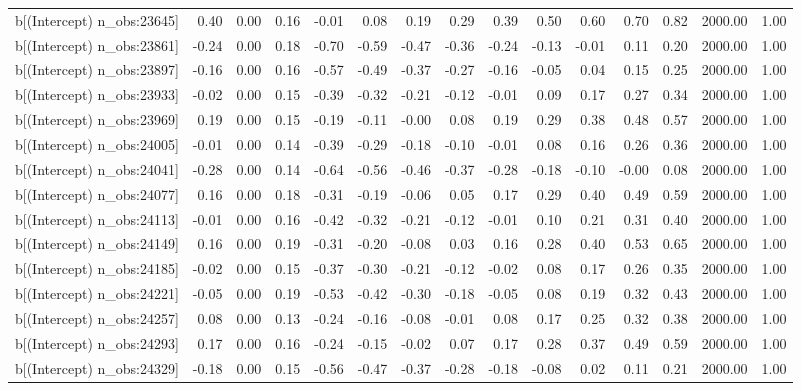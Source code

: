 \begin{table}[ht]
\begin{tabular}{rrrrrrrrrrrrrrr}
  b[(Intercept) n\_obs:23645] & 0.40 & 0.00 & 0.16 & -0.01 & 0.08 & 0.19 & 0.29 & 0.39 & 0.50 & 0.60 & 0.70 & 0.82 & 2000.00 & 1.00 \\ 
  b[(Intercept) n\_obs:23861] & -0.24 & 0.00 & 0.18 & -0.70 & -0.59 & -0.47 & -0.36 & -0.24 & -0.13 & -0.01 & 0.11 & 0.20 & 2000.00 & 1.00 \\ 
  b[(Intercept) n\_obs:23897] & -0.16 & 0.00 & 0.16 & -0.57 & -0.49 & -0.37 & -0.27 & -0.16 & -0.05 & 0.04 & 0.15 & 0.25 & 2000.00 & 1.00 \\ 
  b[(Intercept) n\_obs:23933] & -0.02 & 0.00 & 0.15 & -0.39 & -0.32 & -0.21 & -0.12 & -0.01 & 0.09 & 0.17 & 0.27 & 0.34 & 2000.00 & 1.00 \\ 
  b[(Intercept) n\_obs:23969] & 0.19 & 0.00 & 0.15 & -0.19 & -0.11 & -0.00 & 0.08 & 0.19 & 0.29 & 0.38 & 0.48 & 0.57 & 2000.00 & 1.00 \\ 
  b[(Intercept) n\_obs:24005] & -0.01 & 0.00 & 0.14 & -0.39 & -0.29 & -0.18 & -0.10 & -0.01 & 0.08 & 0.16 & 0.26 & 0.36 & 2000.00 & 1.00 \\ 
  b[(Intercept) n\_obs:24041] & -0.28 & 0.00 & 0.14 & -0.64 & -0.56 & -0.46 & -0.37 & -0.28 & -0.18 & -0.10 & -0.00 & 0.08 & 2000.00 & 1.00 \\ 
  b[(Intercept) n\_obs:24077] & 0.16 & 0.00 & 0.18 & -0.31 & -0.19 & -0.06 & 0.05 & 0.17 & 0.29 & 0.40 & 0.49 & 0.59 & 2000.00 & 1.00 \\ 
  b[(Intercept) n\_obs:24113] & -0.01 & 0.00 & 0.16 & -0.42 & -0.32 & -0.21 & -0.12 & -0.01 & 0.10 & 0.21 & 0.31 & 0.40 & 2000.00 & 1.00 \\ 
  b[(Intercept) n\_obs:24149] & 0.16 & 0.00 & 0.19 & -0.31 & -0.20 & -0.08 & 0.03 & 0.16 & 0.28 & 0.40 & 0.53 & 0.65 & 2000.00 & 1.00 \\ 
  b[(Intercept) n\_obs:24185] & -0.02 & 0.00 & 0.15 & -0.37 & -0.30 & -0.21 & -0.12 & -0.02 & 0.08 & 0.17 & 0.26 & 0.35 & 2000.00 & 1.00 \\ 
  b[(Intercept) n\_obs:24221] & -0.05 & 0.00 & 0.19 & -0.53 & -0.42 & -0.30 & -0.18 & -0.05 & 0.08 & 0.19 & 0.32 & 0.43 & 2000.00 & 1.00 \\ 
  b[(Intercept) n\_obs:24257] & 0.08 & 0.00 & 0.13 & -0.24 & -0.16 & -0.08 & -0.01 & 0.08 & 0.17 & 0.25 & 0.32 & 0.38 & 2000.00 & 1.00 \\ 
  b[(Intercept) n\_obs:24293] & 0.17 & 0.00 & 0.16 & -0.24 & -0.15 & -0.02 & 0.07 & 0.17 & 0.28 & 0.37 & 0.49 & 0.59 & 2000.00 & 1.00 \\ 
  b[(Intercept) n\_obs:24329] & -0.18 & 0.00 & 0.15 & -0.56 & -0.47 & -0.37 & -0.28 & -0.18 & -0.08 & 0.02 & 0.11 & 0.21 & 2000.00 & 1.00 \\ 

\end{tabular}
\end{table}
